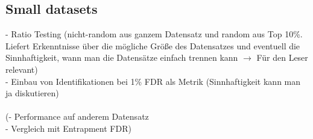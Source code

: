 \subsection{Small datasets}
- Ratio Testing (nicht-random aus ganzem Datensatz und random aus Top 10\%. Liefert Erkenntnisse über die mögliche Größe des Datensatzes und eventuell die Sinnhaftigkeit, wann man die Datensätze einfach trennen kann $\rightarrow$ Für den Leser relevant)\\
- Einbau von Identifikationen bei 1\% FDR als Metrik (Sinnhaftigkeit kann man ja diskutieren)\\\\			
(- Performance auf anderem Datensatz\\
- Vergleich mit Entrapment FDR)

